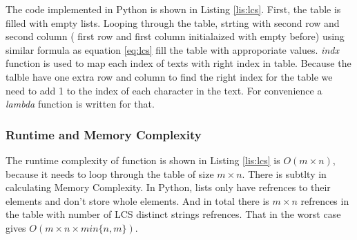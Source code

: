 The code implemented in Python is shown in Listing \ref{lis:lcs}. First, the table is filled with empty
lists. Looping through the table, strting with second row and second column
( first row and first column initialaized with empty before)
using similar formula as equation \ref{eq:lcs} fill the table with approporiate values.
\textit{indx} function is used to map each index of texts with right index in
table. Because the talble have one extra row and column to find the right index for the table we need
to add 1 to the index of each character in the text. For convenience a \textit{lambda}
function is written for that.
\subsubsection{Runtime and Memory Complexity}
The runtime complexity of function is shown in Listing \ref{lis:lcs} is $O(m \times n)$, because
it needs to loop through the table of size $m \times n$.
There is subtlty in calculating Memory Complexity. In Python, lists
only have refrences to their elements and don't store whole elements.
And in total there is $ m \times n$ refrences in the table with number of
LCS distinct strings refrences. That in the worst case gives $O(m \times n \times min\{n,m\})$.